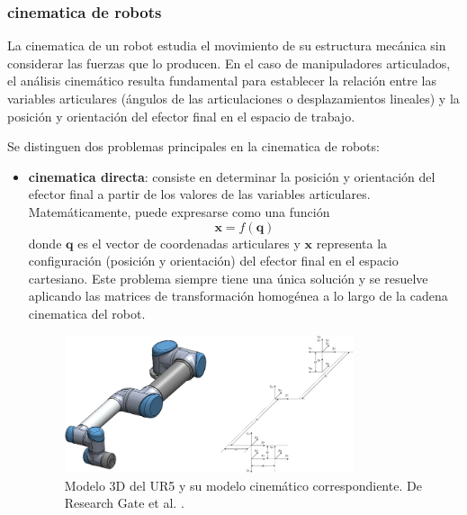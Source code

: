 \documentclass[12pt,a4paper,oneside]{report}
\begin{document}
\subsubsection{\gls{cinematica} de \glspl{robot}}

La \gls{cinematica} de un \gls{robot} estudia el movimiento de su estructura mecánica sin
considerar las fuerzas que lo producen. En el caso de manipuladores
articulados, el análisis cinemático resulta fundamental para establecer la
relación entre las variables articulares (ángulos de las articulaciones o
desplazamientos lineales) y la posición y orientación del efector final en el
espacio de trabajo.

Se distinguen dos problemas principales en la \gls{cinematica} de \glspl{robot}:

\begin{itemize}
    \item \textbf{\gls{cinematica} directa}: consiste en determinar la posición y
    orientación del efector final a partir de los valores de las variables
    articulares. Matemáticamente, puede expresarse como una función
    \begin{equation}
    \mathbf{x} = f(\mathbf{q})
    \label{eq:cinematica_directa}
    \end{equation}
    donde $\mathbf{q}$ es el vector de coordenadas articulares y $\mathbf{x}$
    representa la configuración (posición y orientación) del efector final en
    el espacio cartesiano. Este problema siempre tiene una única solución y se
    resuelve aplicando las matrices de transformación homogénea a lo largo de
    la cadena \gls{cinematica} del \gls{robot}.

    \captionsetup{width=\linewidth}
    \begin{figure}[h]
    \centering
    \includegraphics[width=0.8\textwidth]{figuras/Cinematica.png}
    \caption{Modelo 3D del UR5 y su modelo cinemático correspondiente. De Research Gate et al. \cite{researchgate}.}
    \label{fig:Cinematica_directa}
    \end{figure}


\end{itemize}
\end{document}
